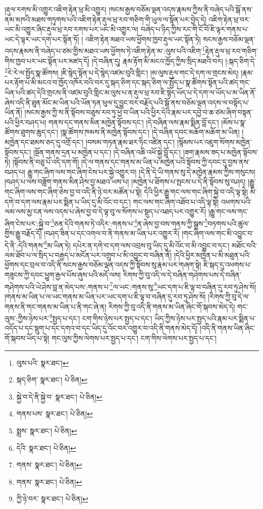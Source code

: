 །རྡུལ་རགས་མི་འགྱུར་འཇིག་རྟེན་ཕྲ་མི་འགྱུར། །སངས་རྒྱས་བཅོམ་ལྡན་འདས་རྣམས་ཀྱིས་ནི་བཞེད་པའི་སྒོ་ནས་ནམ་མཁའི་མཐས་གཏུགས་པའི་འཇིག་རྟེན་རྡུལ་ཕྲ་རབ་གཅིག་གི་ཡུལ་ལ་སྟོན་པར་བྱེད་དེ། འཇིག་རྟེན་ཕྲ་བར་ཡང་མི་འགྱུར་ཞིང་རྡུལ་ཕྲ་རབ་རགས་པར་ཡང་མི་འགྱུར་ལ། བཞེད་པ་ཉིད་ཀྱིས་རང་གི་ངོ་བོ་ཇི་ལྟར་གནས་པ་ཡང་དེ་ལྟར་ཡང་དག་པར་སྟོན་ཏོ། །
འཇིག་རྟེན་མཐའ་ཡས་ཕྱོགས་ཁྱབ་རྡུལ་ཡང་སྟོན་ཏེ། སངས་རྒྱས་བཅོམ་ལྡན་འདས་རྣམས་ནི་བཞེད་པ་ཙམ་གྱིས་མཐའ་ཡས་ཕྱོགས་ཏེ་འཇིག་རྟེན་མ་:ལུས་པའི་འཇིག་\footnote{ལུས་པའི་  སྣར་ཐང་། }རྟེན་རྡུལ་ཕྲ་རབ་གཅིག་གིས་ཁྱབ་པར་ཡང་སྟོན་པར་མཛད་དོ། །དེ་བཞིན་དུ། རྣམ་རྟོག་མི་མངའ་ཁྱོད་ཀྱིས་སྲིད་མཐའི་བར། །:སྐད་ཅིག་དེ་\footnote{སྐད་ཅིག་  སྣར་ཐང་།  པེ་ཅིན། }རེ་རེ་ལ་སྤྱོད་སྣ་ཚོགས། །ཇི་སྙེད་སྟོན་པ་དེ་སྙེད་འཛམ་བུའི་གླིང་། །མ་ལུས་རྡུལ་གང་དེ་དག་ལ་གྲངས་མེད། །རྣམ་པར་རྟོག་པ་མི་མངའ་བ་ཁྱོད་འཁོར་བའི་བར་དུ་སྐད་ཅིག་དང་སྐད་ཅིག་ལ་སྤྱོད་པ་སྣ་ཚོགས་སྟོན་པའི་ཚད་གང་ཡིན་པའི་ཚད་དེའི་གྲངས་ནི་འཛམ་བུའི་གླིང་མ་ལུས་པ་ན་རྡུལ་ཕྲ་རབ་ཇི་སྙེད་ཡོད་པ་དེ་དག་ལ་ཡོད་པ་མ་ཡིན་ནོ་ཞེས་འདི་ནི་ཐུན་མོང་མ་ཡིན་པའི་ཡོན་ཏན་ཕུལ་དུ་བྱུང་བར་བརྗོད་པའི་སྒོ་ནས་བཅོམ་ལྡན་འདས་ལ་བསྟོད་པ་ཡིན་ནོ། །སངས་རྒྱས་ཀྱི་ས་ནི་སྟོབས་བཅུས་རབ་ཏུ་ཕྱེ་བ་ཡིན་པའི་ཕྱིར་དེའི་རྣམ་པར་དབྱེ་བ་ཆ་ཙམ་ཞིག་བསྟན་པའི་ཕྱིར་བཤད་པ། གནས་དང་གནས་མིན་མཁྱེན་སྟོབས་དང་། །དེ་བཞིན་ལས་རྣམ་སྨིན་བློ་དང་། །མོས་པ་སྣ་ཚོགས་ཐུགས་ཆུད་དང་། །སྣ་ཚོགས་ཁམས་ནི་མཁྱེན་སྟོབས་དང་། །དེ་བཞིན་དབང་མཆོག་མཆོག་མ་ཡིན། །མཁྱེན་དང་ཐམས་ཅད་དུ་འགྲོ་དང་། །བསམ་གཏན་རྣམ་ཐར་ཏིང་འཛིན་དང་། །སྙོམས་པར་འཇུག་སོགས་མཁྱེན་སྟོབས་དང་། །སྔོན་གནས་དྲན་པ་མཁྱེན་པ་དང་། །དེ་བཞིན་འཆི་འཕོ་སྐྱེ་བློ་དང་། །ཟག་རྣམས་ཟད་པ་མཁྱེན་སྟོབས་ཏེ། །སྟོབས་ནི་བཅུ་པོ་འདི་དག་གོ། །དེ་ལ་གནས་དང་གནས་མ་ཡིན་པ་མཁྱེན་པའི་སྟོབས་ཀྱི་དབང་དུ་བྱས་ནས་བཤད་པ། རྒྱུ་གང་ཞིག་ལས་གང་ཞིག་ངེས་པར་སྐྱེ་འགྱུར་བ། །དེ་ནི་དེ་ཡི་གནས་སུ་དེ་མཁྱེན་རྣམས་ཀྱིས་གསུངས། །བཤད་པ་ལས་བཟློག་གནས་མིན་ཤེས་བྱ་མཐའ་ཡས་པ། །མཁྱེན་པ་ཐོགས་པ་སྤངས་པ་དེ་ནི་སྟོབས་སུ་བཤད། །རྒྱུ་གང་ཞིག་ལས་གང་ཞིག་ཅེས་བྱ་བ་འདི་ནི་ཉེ་བར་མཚོན་པ་སྟེ། དེའི་ཕྱིར་རྒྱུ་གང་ལས་གང་ཞིག་སྐྱེ་བ་འདི་ལྟ་སྟེ། མི་དགེ་བ་དག་ལས་རྣམ་པར་སྨིན་པ་ཡིད་དུ་མི་འོང་བ་དང་། གང་ལས་གང་ཞིག་འཐོབ་པ་འདི་ལྟ་སྟེ། འཕགས་པའི་ལམ་ལས་མྱ་ངན་ལས་འདས་པ་ཞེས་བྱ་བ་དེ་ལྟ་བུ་ལ་སོགས་པ་སྡུད་པ་འཐད་པར་འགྱུར་རོ། །རྒྱུ་གང་ལས་གང་ཞིག་ངེས་པར་:སྐྱེ་བ་\footnote{སྐྱེ་བ་དེ་ནི་སྐྱེ་བ་  སྣར་ཐང་།  པེ་ཅིན། }ཅན་དེའི་གནས་ཏེ་འདིར་:གནས་པ་\footnote{གནས་པས་  སྣར་ཐང་།  པེ་ཅིན། }ན་ཞེས་བྱ་བས་གནས་ཀྱི་སྒྲས་\footnote{སྨྲས་  སྣར་ཐང་།  པེ་ཅིན། }བཏགས་པའི་ཚུལ་གྱིས་རྒྱུ་བརྗོད་དོ། །བཤད་ཟིན་པ་དང་འགལ་བ་ནི་གནས་མ་ཡིན་པར་འགྱུར་རོ། །གང་ཞིག་ལས་གང་མི་འབྱུང་བ་དེ་ནི་:དེའི་གནས་\footnote{དེའི་  སྣར་ཐང་།  པེ་ཅིན། }མ་ཡིན་ཏེ། དཔེར་ན་དགེ་བ་དག་ལས་འབྲས་བུ་ཡིད་དུ་མི་འོང་བ་མི་འབྱུང་བ་དང་། མཐོང་བའི་ལམ་ཐོབ་པ་ལ་སྲིད་པ་བརྒྱད་པ་མངོན་པར་འགྲུབ་པ་མི་འབྱུང་བ་བཞིན་ནོ། །དེའི་ཕྱིར་མཁྱེན་པ་མི་མཐུན་པའི་ཕྱོགས་དང་བྲལ་བ་འདི་ནི་སངས་རྒྱས་བཅོམ་ལྡན་འདས་ཀྱི་སྟོབས་སུ་རྣམ་པར་གཞག་སྟེ། ཇི་སྐད་དུ་འཕགས་པ་གཟུངས་ཀྱི་དབང་ཕྱུག་རྒྱལ་པོས་ཞུས་པའི་མདོ་ལས། རིགས་ཀྱི་བུ་འདི་ལ་དེ་བཞིན་གཤེགས་པས་དེ་བཞིན་གཤེགས་པའི་ཡེ་ཤེས་བླ་ན་མེད་པས་:གནས་པ་\footnote{གནས་  སྣར་ཐང་།  པེ་ཅིན། }ལ་ཡང་:གནས་སུ་\footnote{གནས་  སྣར་ཐང་།  པེ་ཅིན། }ཡང་དག་པ་ཇི་ལྟ་བ་བཞིན་དུ་རབ་ཏུ་ཤེས་སོ། །གནས་མ་ཡིན་པ་ལ་ཡང་གནས་མ་ཡིན་པར་ཡང་དག་པ་ཇི་ལྟ་བ་བཞིན་དུ་རབ་ཏུ་ཤེས་སོ། །རིགས་ཀྱི་བུ་དེ་ལ་གནས་ནི་གང་གནས་མ་ཡིན་པ་ནི་གང་ཞེ་ན། རིགས་ཀྱི་བུ་འདི་ནི་གནས་མ་ཡིན་ཞིང་གོ་སྐབས་མེད་དེ། གང་ལུས་:ཀྱིས་ཉེས་པར་\footnote{ཀྱི་ཉེ་བར་  སྣར་ཐང་།  པེ་ཅིན། }སྤྱད་པ་དང་། ངག་གིས་ཉེས་པར་སྤྱད་པ་དང་། ཡིད་ཀྱིས་ཉེས་པར་སྤྱད་པའི་རྣམ་པར་སྨིན་པ་འདོད་པ་དང་སྡུག་པ་དང་དགའ་བ་དང་ཡིད་དུ་འོང་བར་འགྱུར་བ་འདི་ནི་གནས་མེད་དོ། །འདི་ནི་གནས་ཡིན་ཞིང་གོ་སྐབས་ཡོད་པ་སྟེ། གང་ལུས་ཀྱིས་ལེགས་པར་སྤྱད་པ་དང་། ངག་གིས་ལེགས་པར་སྤྱད་པ་དང་། 